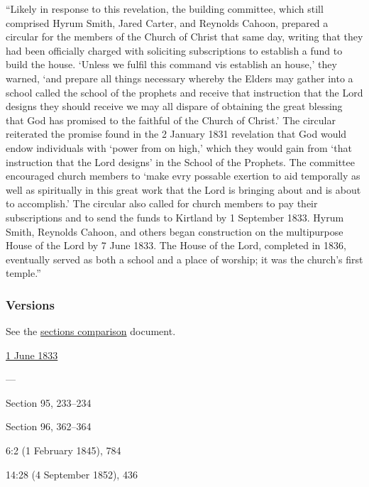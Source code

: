 			``Likely in response to this revelation, the building committee, which still comprised Hyrum Smith, Jared Carter, and Reynolds Cahoon, prepared a circular for the members of the Church of Christ that same day, writing that they had been officially charged with soliciting subscriptions to establish a fund to build the house. `Unless we fulfil this command vis establish an house,' they warned, `and prepare all things necessary whereby the Elders may gather into a school called the school of the prophets and receive that instruction that the Lord designs they should receive we may all dispare of obtaining the great blessing that God has promised to the faithful of the Church of Christ.' The circular reiterated the promise found in the 2 January 1831 revelation that God would endow individuals with `power from on high,' which they would gain from `that instruction that the Lord designs' in the School of the Prophets. The committee encouraged church members to `make evry possable exertion to aid temporally as well as spiritually in this great work that the Lord is bringing about and is about to accomplish.' The circular also called for church members to pay their subscriptions and to send the funds to Kirtland by 1 September 1833. Hyrum Smith, Reynolds Cahoon, and others began construction on the multipurpose House of the Lord by 7 June 1833. The House of the Lord, completed in 1836, eventually served as both a school and a place of worship; it was the church's first temple.''
			
	\subsubsection{Versions}
		\label{DC95-V}
		
		See the \href{https://drive.google.com/file/d/1goAvNz8jS4R8slYfMG_db55Ty2z_vmgK/view?usp=sharing}{sections comparison} document.
	
		\begin{compactdesc}
			\item[JSP] \hyperref[EMS-1833-JS-1-JUN-1833]{1 June 1833}
			\item[BC] ---
			\item[DC 1835] Section 95, 233--234
			\item[DC 1844] Section 96, 362--364
			\item[TS] 6:2 (1 February 1845), 784
			\item[MS] 14:28 (4 September 1852), 436
		\end{compactdesc}

